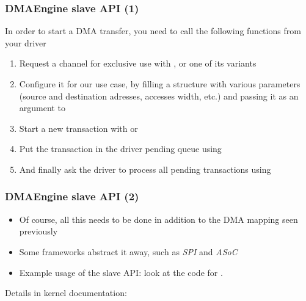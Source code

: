 \begin{frame}
  \frametitle{DMAEngine slave API (1)}
    In order to start a DMA transfer, you need to call the
    following functions from your driver
    \begin{enumerate}
    \item Request a channel for exclusive use with
      , or one of its variants
    \item Configure it for our use case, by filling a
       structure with various parameters
      (source and destination adresses, accesses width, etc.) and
      passing it as an argument to 
    \item Start a new transaction with
       or
    \item Put the transaction in the driver pending queue using
    \item And finally ask the driver to process all pending
      transactions using 
    \end{enumerate}
\end{frame}

\begin{frame}
  \frametitle{DMAEngine slave API (2)}
  \begin{itemize}
  \item Of course, all this needs to be done in addition to the DMA
    mapping seen previously
  \item Some frameworks abstract it away, such as {\em SPI}
    and {\em ASoC}
  \item Example usage of the slave API: look at the code
    for .
  \end{itemize}
  Details in kernel documentation: 
\end{frame}

